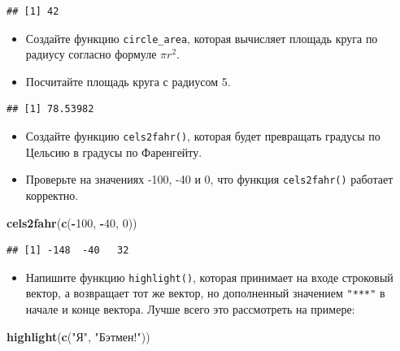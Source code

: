 \documentclass[]{book}
\newenvironment{Shaded}{\begin{snugshade}}{\end{snugshade}}
\newcommand{\KeywordTok}[1]{\textcolor[rgb]{0.13,0.29,0.53}{\textbf{#1}}}
\newcommand{\DecValTok}[1]{\textcolor[rgb]{0.00,0.00,0.81}{#1}}
\newcommand{\StringTok}[1]{\textcolor[rgb]{0.31,0.60,0.02}{#1}}
\newcommand{\OperatorTok}[1]{\textcolor[rgb]{0.81,0.36,0.00}{\textbf{#1}}}
\newcommand{\NormalTok}[1]{#1}
\providecommand{\tightlist}{%
  \setlength{\itemsep}{0pt}\setlength{\parskip}{0pt}}
\begin{document}
\begin{verbatim}
## [1] 42
\end{verbatim}

\begin{itemize}
\item
  Создайте функцию \texttt{circle\_area}, которая вычисляет площадь
  круга по радиусу согласно формуле \(\pi r^2\).
\item
  Посчитайте площадь круга с радиусом 5.
\end{itemize}

\begin{verbatim}
## [1] 78.53982
\end{verbatim}

\begin{itemize}
\item
  Создайте функцию \texttt{cels2fahr()}, которая будет превращать
  градусы по Цельсию в градусы по Фаренгейту.
\item
  Проверьте на значениях -100, -40 и 0, что функция \texttt{cels2fahr()}
  работает корректно.
\end{itemize}

\begin{Shaded}
\begin{Highlighting}[]
\KeywordTok{cels2fahr}\NormalTok{(}\KeywordTok{c}\NormalTok{(}\OperatorTok{-}\DecValTok{100}\NormalTok{, }\OperatorTok{-}\DecValTok{40}\NormalTok{, }\DecValTok{0}\NormalTok{))}
\end{Highlighting}
\end{Shaded}

\begin{verbatim}
## [1] -148  -40   32
\end{verbatim}

\begin{itemize}
\tightlist
\item
  Напишите функцию \texttt{highlight()}, которая принимает на входе
  строковый вектор, а возвращает тот же вектор, но дополненный значением
  \texttt{"***"} в начале и конце вектора. Лучше всего это рассмотреть
  на примере:
\end{itemize}

\begin{Shaded}
\begin{Highlighting}[]
\KeywordTok{highlight}\NormalTok{(}\KeywordTok{c}\NormalTok{(}\StringTok{"Я"}\NormalTok{, }\StringTok{"Бэтмен!"}\NormalTok{))}
\end{Highlighting}
\end{Shaded}
\end{document}

